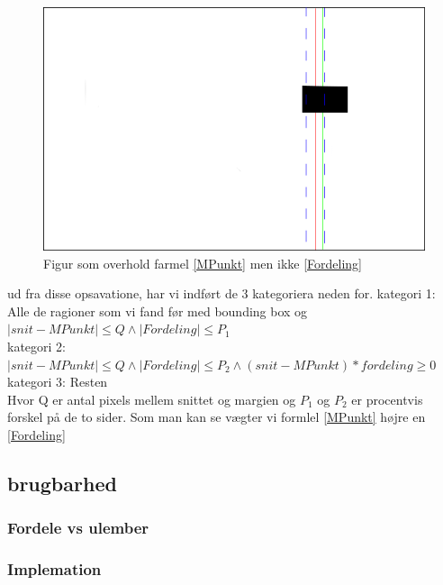 \begin{figure}[h]
	\begin{center}
		\includegraphics[scale=0.5,angle=0]{afsnit/vores_implementation/billeder/udvidet_loesning/dontwork2.png}
	\end{center}
	\caption[]{Figur som overhold farmel \ref{MPunkt} men ikke \ref{Fordeling}}
	\label{dontwork2}
\end{figure}

ud fra disse opsavatione, har vi indført de 3 kategoriera neden for.
kategori 1: Alle de ragioner som vi fand før med bounding box og $ |snit - MPunkt| \leq Q \wedge |Fordeling| \leq P_1$ \\
kategori 2: $|snit - MPunkt| \leq Q \wedge |Fordeling| \leq P_2 \wedge (snit - MPunkt)*fordeling \geq 0$ \\
kategori 3: Resten\\

Hvor Q er antal pixels mellem snittet og margien og $P_1$ og $P_2$ er procentvis forskel på de to sider.
Som man kan se vægter vi formlel \ref{MPunkt} højre en \ref{Fordeling}


\subsection{brugbarhed}
\subsubsection{Fordele vs ulember}

\subsubsection{Implemation}
